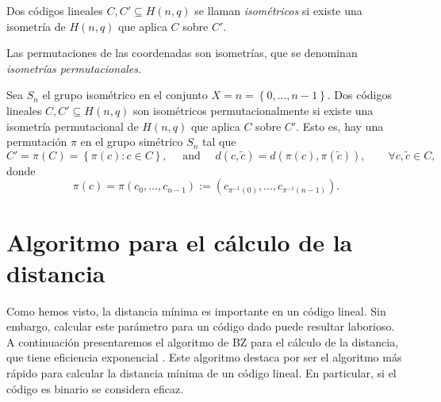 \begin{definition}
    Dos códigos lineales $C, C' \subseteq H(n,q)$ se llaman \emph{isométricos} si existe una isometría de $H(n,q)$ que aplica $C$ sobre $C'$.
\end{definition}

Las permutaciones de las coordenadas son isometrías, que se denominan \emph{isometrías permutacionales}.

\begin{definition}
    Sea $S_n$ el grupo isométrico en el conjunto $X = n = \left\{ 0,..., n-1 \right\}$. Dos códigos lineales $C, C' \subseteq H(n,q)$ son isométricos permutacionalmente si existe una isometría permutacional de $H(n,q)$ que aplica $C$ sobre $C'$. Esto es, hay una permutación $\pi$ en el grupo simétrico $S_n$ tal que 
    \[
        C' = \pi (C) = \left\{ \pi(c) : c \in C \right\}, \quad \text{ and } \quad d(c, \tilde{c}) = d(\pi(c), \pi(\tilde{c})), \qquad \forall c,\tilde{c} \in C,
    \]
    donde
    \[
        \pi(c) = \pi(c_0,...,c_{n-1}) := \left( c_{\pi ^{-1} (0)}, ..., c_{\pi ^{-1} (n-1)} \right).
    \]
\end{definition}

\section{Algoritmo para el cálculo de la distancia}

Como hemos visto, la distancia mínima es importante en un código lineal. Sin embargo, calcular este parámetro para un código dado puede resultar laborioso. A continuación presentaremos el algoritmo de BZ para el cálculo de la distancia, que tiene eficiencia exponencial \cite[Sección 1.8]{Wassermann_2006}. Este algoritmo destaca por ser el algoritmo más rápido para calcular la distancia mínima de un código lineal. En particular, si el código es binario se considera eficaz.

